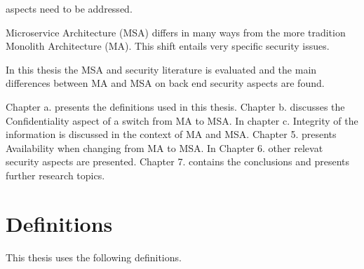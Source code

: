 \begin{sloppypar}
\begin{sloppypar}
    aspects need to be addressed. 
\end{sloppypar}
\begin{sloppypar}
    Microservice Architecture (MSA) differs in many ways from 
    the more tradition Monolith Architecture (MA). This shift entails very 
    specific security issues.
\end{sloppypar}
\begin{sloppypar}
    In this thesis the MSA and security literature is evaluated and the main 
    differences between MA and MSA on back end security aspects are found.
\end{sloppypar}
\begin{sloppypar}
    Chapter a. presents the definitions used in this thesis. 
    Chapter b. discusses the Confidentiality aspect of a switch from MA to MSA. 
    In chapter c. Integrity of the information is discussed in the context of 
    MA and MSA. 
    Chapter 5. presents Availability when changing from MA to MSA.
    In Chapter 6. other relevat security aspects are presented.
    Chapter 7. contains the conclusions and presents further research topics.
\end{sloppypar}




\section{Definitions}
\begin{sloppypar}
    This thesis uses the following definitions.
\end{sloppypar}


\end{sloppypar}
